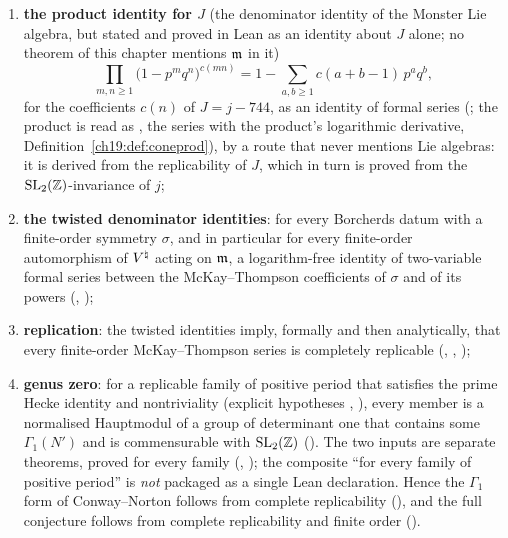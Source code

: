 \begin{enumerate}[label=(\Roman*)]
\item \textbf{the product identity for $J$} (the denominator identity of the Monster Lie algebra, but stated and
  proved in Lean as an identity about $J$ alone; no theorem of this chapter mentions $\mathfrak{m}$ in it)
  \begin{equation}\label{ch19:eq:knz-intro}
    \prod_{m,n\ge1}\bigl(1-p^mq^n\bigr)^{c(mn)}=1-\sum_{a,b\ge1}c(a+b-1)\,p^aq^b ,
  \end{equation}
  for the coefficients $c(n)$ of $J=j-744$, as an identity of formal series (; the product is read as
  , the series with the product's logarithmic derivative, Definition~\ref{ch19:def:coneprod}), by a route that
  never mentions Lie algebras: it is derived from the replicability of $J$, which in turn is proved from the
  $\mathrm{SL}_2(\mathbb{Z})$-invariance of $j$;
\item \textbf{the twisted denominator identities}: for every Borcherds datum with a finite-order symmetry $\sigma$,
  and in particular for every finite-order automorphism of ${V^{\natural}}$ acting on $\mathfrak{m}$, a logarithm-free identity
  of two-variable formal series between the McKay--Thompson coefficients of $\sigma$ and of its powers
  (, );
\item \textbf{replication}: the twisted identities imply, formally and then analytically, that every finite-order
  McKay--Thompson series is completely replicable (, ,
  );
\item \textbf{genus zero}: for a replicable family of positive period that satisfies the prime Hecke identity and
  nontriviality (explicit hypotheses , ), every member is a normalised Hauptmodul of a group of
  determinant one that contains some $\Gamma_1(N')$ and is commensurable with $\mathrm{SL}_2(\mathbb{Z})$
  ().  The two inputs are separate theorems, proved for every family
  (, ); the composite
  ``for every family of positive period'' is \emph{not} packaged as a single Lean declaration.  Hence the $\Gamma_1$ form of
  Conway--Norton follows from complete replicability (), and the full
  conjecture follows from complete replicability and finite order ().
\end{enumerate}
